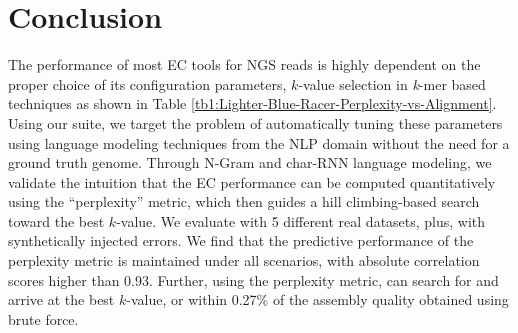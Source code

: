 \vspace{-12pt}
\section{Conclusion}
\vspace{-6pt}
The performance of most EC tools for NGS reads is highly dependent on the proper choice of its configuration parameters, \eg $k$-value selection in \textit{k}-mer based techniques as shown in Table \ref{tb1:Lighter-Blue-Racer-Perplexity-vs-Alignment}. Using our \name suite, we target the problem of automatically tuning these parameters using language modeling techniques from the NLP domain without the need for a ground truth genome. 
Through N-Gram and char-RNN language modeling, we validate the intuition that the EC performance can be computed quantitatively using the ``perplexity'' metric, which then guides a hill climbing-based search toward the best $k$-value. 
We evaluate \name with 5 different real datasets, plus, with synthetically injected errors. We find that the predictive performance of the perplexity metric is maintained under all scenarios, with absolute correlation scores higher than 0.93. Further, using the perplexity metric, \name can search for and arrive at the best $k$-value, or within 0.27\% of the assembly quality obtained using brute force.
